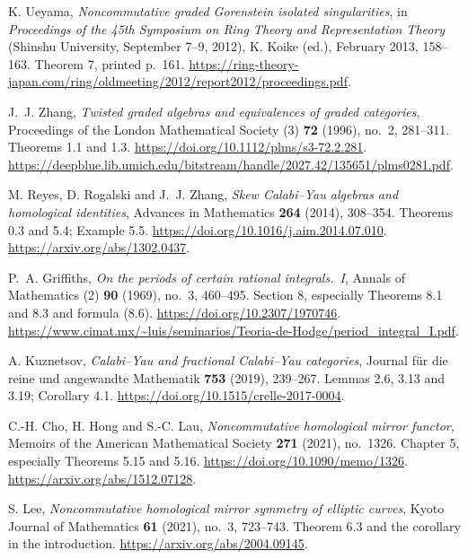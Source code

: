 
K. Ueyama,
\emph{Noncommutative graded Gorenstein isolated singularities},
in \emph{Proceedings of the 45th Symposium on Ring Theory and Representation Theory}
(Shinshu University, September 7--9, 2012),
K. Koike (ed.), February 2013, 158--163.
Theorem 7, printed p.~161.
\url{https://ring-theory-japan.com/ring/oldmeeting/2012/report2012/proceedings.pdf}.

J.~J. Zhang,
\emph{Twisted graded algebras and equivalences of graded categories},
Proceedings of the London Mathematical Society (3) \textbf{72} (1996), no.~2, 281--311.
Theorems 1.1 and 1.3.
\url{https://doi.org/10.1112/plms/s3-72.2.281}.
\url{https://deepblue.lib.umich.edu/bitstream/handle/2027.42/135651/plms0281.pdf}.

M. Reyes, D. Rogalski and J.~J. Zhang,
\emph{Skew Calabi--Yau algebras and homological identities},
Advances in Mathematics \textbf{264} (2014), 308--354.
Theorems 0.3 and 5.4; Example 5.5.
\url{https://doi.org/10.1016/j.aim.2014.07.010}.
\url{https://arxiv.org/abs/1302.0437}.

P.~A. Griffiths,
\emph{On the periods of certain rational integrals.~I},
Annals of Mathematics (2) \textbf{90} (1969), no.~3, 460--495.
Section 8, especially Theorems 8.1 and 8.3 and formula (8.6).
\url{https://doi.org/10.2307/1970746}.
\url{https://www.cimat.mx/~luis/seminarios/Teoria-de-Hodge/period_integral_I.pdf}.

A. Kuznetsov,
\emph{Calabi--Yau and fractional Calabi--Yau categories},
Journal f\"ur die reine und angewandte Mathematik \textbf{753} (2019), 239--267.
Lemmas 2.6, 3.13 and 3.19; Corollary 4.1.
\url{https://doi.org/10.1515/crelle-2017-0004}.

C.-H. Cho, H. Hong and S.-C. Lau,
\emph{Noncommutative homological mirror functor},
Memoirs of the American Mathematical Society \textbf{271} (2021), no.~1326.
Chapter 5, especially Theorems 5.15 and 5.16.
\url{https://doi.org/10.1090/memo/1326}.
\url{https://arxiv.org/abs/1512.07128}.

S. Lee,
\emph{Noncommutative homological mirror symmetry of elliptic curves},
Kyoto Journal of Mathematics \textbf{61} (2021), no.~3, 723--743.
Theorem 6.3 and the corollary in the introduction.
\url{https://arxiv.org/abs/2004.09145}.

